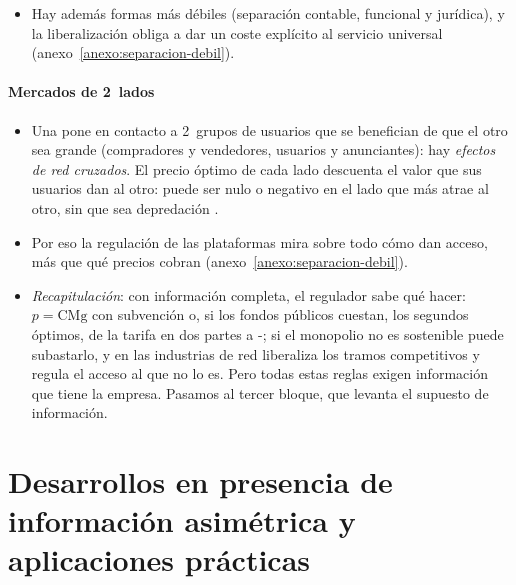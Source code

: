 \documentclass[11pt]{article}
\begin{document}
\begin{itemize}
\item Hay además formas más débiles (separación contable, funcional y jurídica), y la liberalización obliga a dar un coste explícito al servicio universal  (anexo~\ref{anexo:separacion-debil}).
\end{itemize}

\paragraph{Mercados de 2~lados}

\begin{itemize}
\item Una  pone en contacto a 2~grupos de usuarios que se benefician de que el otro sea grande (compradores y vendedores, usuarios y anunciantes): hay \emph{efectos de red cruzados}\nocite{RochetTirole2003Platform}. El precio óptimo de cada lado descuenta el valor que sus usuarios dan al otro: puede ser nulo o negativo en el lado que más atrae al otro, sin que sea depredación\nocite{Armstrong2006Competition} .
\item Por eso la regulación de las plataformas mira sobre todo cómo dan acceso, más que qué precios cobran (anexo~\ref{anexo:separacion-debil}).
\end{itemize}

\begin{itemize}
\item \emph{Recapitulación}: con información completa, el regulador sabe qué hacer: $p=\mathrm{CMg}$ con subvención o, si los fondos públicos cuestan, los segundos óptimos, de la tarifa en dos partes a -; si el monopolio no es sostenible puede subastarlo, y en las industrias de red liberaliza los tramos competitivos y regula el acceso al que no lo es. Pero todas estas reglas exigen información que tiene la empresa. Pasamos al tercer bloque, que levanta el supuesto de información.
\end{itemize}


\section{Desarrollos en presencia de información asimétrica\cortetitulo{} y aplicaciones prácticas}\label{sec:informacion-asimetrica}
\end{document}

